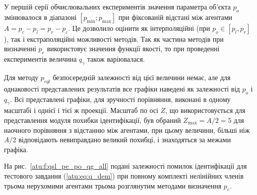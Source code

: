 У першій серії обчислювальних експериментів значення параметра об'єкта $p_o$
змінювалося в діапазоні $[p_{\min}; p_{\max}]$ при фіксованій відстані
між агентами $A = p_c - p_l = p_r - p_c$. Це дозволило оцінити як
інтерполяційні (при $p_o \in [p_l, p_r]$), так і екстраполяційні можливості
методів. Так як частина методів при визначенні $p_e$ використовує значення
функції якості, то при проведенні експериментів величина $q_\gamma$ також
варіювалася.

Для методу
$ p_{eql} $ безпосередній залежності від цієї величини немає, але
для однаковості представлених результатів все графіки наведені
як залежності від
$ p_o $ і
$ q_\gamma $. Всі представлені графіки, для зручності порівняння,
виконані в одному масштабі і однієї і тієї ж проекції. Масштаб
по осі
$ Z $, що використовується для представлення модуля похибки
ідентифікації, був обраний
$ Z_{\max} = A / 2 = 5 $ для наочного порівняння з відстанню між агентами,
при цьому величини, більші ніж
$A/2$ відповідають невиправдано великий похибці, і знаходяться
за межами графіка.

На рис.~\ref{atu:f:qsl_pe_po_qg_all} подані залежності помилок
ідентифікації для тестового завдання (\ref{atu:eq:q_dem}) при повному
комплекті нелінійних членів  трьома нерухомими
агентами трьома розглянутим методами визначення $p_e$.

